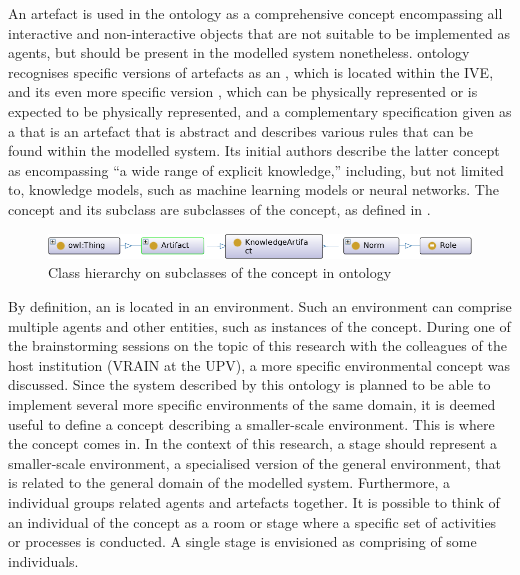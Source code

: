  An artefact is used in the  ontology as a comprehensive concept encompassing all interactive and non-interactive objects that are not suitable to be implemented as agents, but should be present in the modelled system nonetheless.  ontology recognises specific versions of artefacts as an , which is located within the \ac{IVE}, and its even more specific version , which can be physically represented or is expected to be physically represented, and a complementary specification given as a  that is an artefact that is abstract and describes various rules that can be found within the modelled system. Its initial authors describe the latter concept as encompassing \enquote{a wide range of explicit knowledge,} including, but not limited to, knowledge models, such as machine learning models or neural networks. The  concept and its subclass  are subclasses of the  concept,
%
as defined in .

\begin{figure}
    \centering
    \includegraphics[width=0.84\linewidth]{Deliverables/Phase 1.1/Figures/Hierarchy artefact KNartefact norm role.png}
    \caption{Class hierarchy on subclasses of the  concept in  ontology}
    \label{fig:Hierarchy artefact KNartefact norm role}
\end{figure}

 By definition, an  is located in an environment. Such an environment can comprise multiple agents and other entities, such as instances of the  concept. During one of the brainstorming sessions on the topic of this research with the colleagues of the host institution (\acf{VRAIN} at the \ac{UPV}), a more specific environmental concept was discussed. Since the system described by this ontology is planned to be able to implement several more specific environments of the same domain, it is deemed useful to define a concept describing a smaller-scale environment. This is where the  concept comes in. In the context of this research, a stage should represent a smaller-scale environment, a specialised version of the general environment, that is related to the general domain of the modelled system.
Furthermore, a  individual groups related agents and artefacts together. It is possible to think of an individual of the  concept as a room or stage where a specific set of activities or processes is conducted. A single stage is envisioned as comprising of some  individuals.
